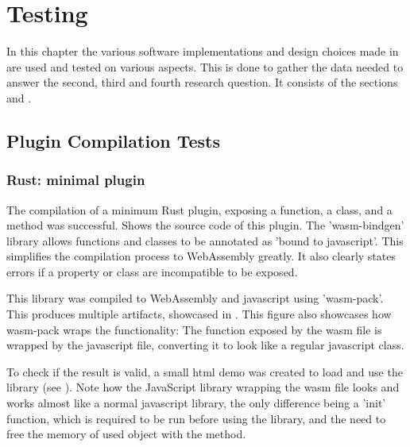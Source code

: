 \chapter{Testing}%
\label{chap:testing}

In this chapter the various software implementations and design choices made in  are used and tested on various aspects. 
This is done to gather the data needed to answer the second, third and fourth research question. 
It consists of the sections  and .


\section{Plugin Compilation Tests}
\label{sec:testing:compilation}

\subsection{Rust: minimal plugin}
The compilation of a minimum Rust plugin, exposing a function, a class, and a method was successful. 
 Shows the source code of this plugin. 
The 'wasm-bindgen' library allows functions and classes to be annotated as 'bound to javascript'. 
This simplifies the compilation process to WebAssembly greatly. 
It also clearly states errors if a property or class are incompatible to be exposed. 

This library was compiled to WebAssembly and javascript using 'wasm-pack'. 
This produces multiple artifacts, showcased in . 
This figure also showcases how wasm-pack wraps the functionality: 
The  function exposed by the wasm file is wrapped by the javascript file, converting it to look like a regular javascript class.

To check if the result is valid, a small html demo was created to load and use the library (see ).
Note how the JavaScript library wrapping the wasm file looks and works almost like a normal javascript library, the only difference being a 'init' function, which is required to be run before using the library, and the need to free the memory of used object with the  method.


